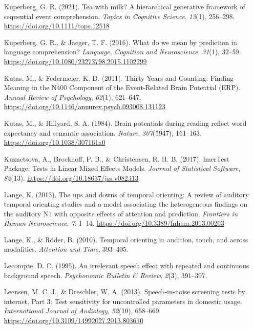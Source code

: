 \documentclass[a4paper, nobind]{templates/ociamthesis}
\newlength{\cslhangindent}
\newenvironment{CSLReferences}[2] %
 {%
  \setlength{\parindent}{0pt}
  \ifodd #1
  \let\oldpar\par
  \def\par{\hangindent=\cslhangindent\oldpar}
  \fi
  \setlength{\parskip}{1mm}
  \setlength{\baselineskip}{6mm}
 }%
 {}
\begin{document}
\begin{CSLReferences}{1}{0}
\leavevmode{}%
Kuperberg, G. R. (2021). {Tea with milk? A hierarchical generative framework of sequential event comprehension}. \emph{Topics in Cognitive Science}, \emph{13}(1), 256--298. \url{https://doi.org/10.1111/tops.12518}

\leavevmode{}%
Kuperberg, G. R., \& Jaeger, T. F. (2016). What do we mean by prediction in language comprehension? \emph{Language, Cognition and Neuroscience}, \emph{31}(1), 32--59. \url{https://doi.org/10.1080/23273798.2015.1102299}

\leavevmode{}%
Kutas, M., \& Federmeier, K. D. (2011). Thirty Years and Counting: Finding Meaning in the N400 Component of the Event-Related Brain Potential (ERP). \emph{Annual Review of Psychology}, \emph{62}(1), 621--647. \url{https://doi.org/10.1146/annurev.psych.093008.131123}

\leavevmode{}%
Kutas, M., \& Hillyard, S. A. (1984). Brain potentials during reading reflect word expectancy and semantic association. \emph{Nature}, \emph{307}(5947), 161--163. \url{https://doi.org/10.1038/307161a0}

\leavevmode{}%
Kuznetsova, A., Brockhoff, P. B., \& Christensen, R. H. B. (2017). lmerTest Package: Tests in Linear Mixed Effects Models. \emph{Journal of Statistical Software}, \emph{82}(13). \url{https://doi.org/10.18637/jss.v082.i13}

\leavevmode{}%
Lange, K. (2013). {The ups and downs of temporal orienting: A review of auditory temporal orienting studies and a model associating the heterogeneous findings on the auditory N1 with opposite effects of attention and prediction}. \emph{Frontiers in Human Neuroscience}, \emph{7}, 1--14. \url{https://doi.org/10.3389/fnhum.2013.00263}

\leavevmode{}%
Lange, K., \& Röder, B. (2010). Temporal orienting in audition, touch, and across modalities. \emph{Attention and Time}, 393--405.

\leavevmode{}%
Lecompte, D. C. (1995). An irrelevant speech effect with repeated and continuous background speech. \emph{Psychonomic Bulletin \& Review}, \emph{2}(3), 391--397.

\leavevmode{}%
Leensen, M. C. J., \& Dreschler, W. A. (2013). {Speech-in-noise screening tests by internet, Part 3: Test sensitivity for uncontrolled parameters in domestic usage}. \emph{International Journal of Audiology}, \emph{52}(10), 658--669. \url{https://doi.org/10.3109/14992027.2013.803610}


\end{CSLReferences}
\end{document}
